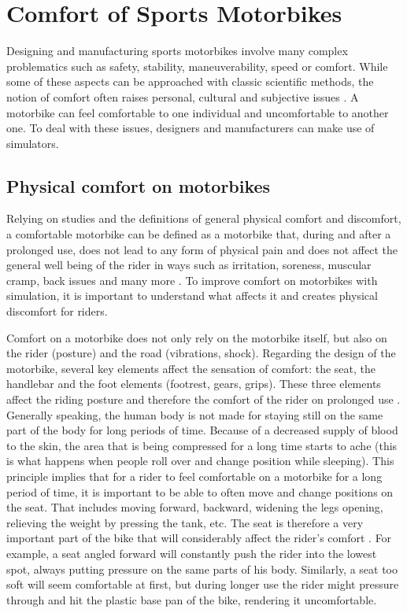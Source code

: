 \documentclass[authoryear,preprint]{sigplanconf}
\begin{document}
\section{Comfort of Sports Motorbikes}

Designing and manufacturing sports motorbikes involve many complex problematics such as safety, stability, maneuverability, speed or comfort. While some of these aspects can be approached with classic scientific methods,
the notion of comfort often raises personal, cultural and subjective issues \cite{Comfort1}. A motorbike can feel comfortable to one individual and uncomfortable to another one. To deal with these issues, designers and manufacturers can make use of simulators.

\subsection{Physical comfort on motorbikes}

Relying on studies and the definitions of general physical comfort and discomfort, a comfortable motorbike can be defined as a motorbike that, during and after a prolonged use, does not lead to any form of physical pain and does not affect the general well being of the rider in ways such as irritation, soreness, muscular cramp, back issues and many more \cite{Discomfort1}. To improve comfort on motorbikes with simulation, it is important to understand what affects it and creates physical discomfort for riders.

Comfort on a motorbike does not only rely on the motorbike itself, but also on the rider (posture) and the road (vibrations, shock). Regarding the design of the motorbike, several key elements affect the sensation of comfort: the seat, the handlebar and the foot elements (footrest, gears, grips). These three elements affect the riding posture and therefore the comfort of the rider on prolonged use \cite{Posture1}. Generally speaking, the human body is not made for staying still on the same part of the body for long periods of time. Because of a decreased supply of blood to the skin, the area that is being compressed for a long time starts to ache \cite{SkinPressure1} (this is what happens when people roll over and change position while sleeping). This principle implies that for a rider to feel comfortable on a motorbike for a long period of time, it is important to be able to often move and change positions on the seat. That includes moving forward, backward, widening the legs opening, relieving the weight by pressing the tank, etc. The seat is therefore a very important part of the bike that will considerably affect the rider's comfort \cite{SeatingComfort}. For example, a seat angled forward will constantly push the rider into the lowest spot, always putting pressure on the same parts of his body. Similarly, a seat too soft will seem comfortable at first, but during longer use the rider might pressure through and hit the plastic base pan of the bike, rendering it uncomfortable.
\end{document}
